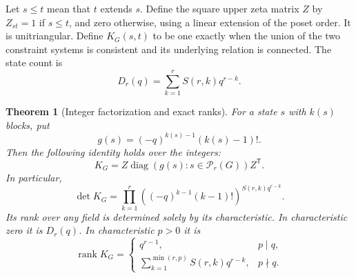 \documentclass[11pt,letterpaper]{article}
\newtheorem{theorem}{Theorem}[section]
\theoremstyle{definition}
\newcommand{\PG}{\mathcal P_r(G)}
\newcommand{\rank}{\operatorname{rank}}
\newcommand{\diag}{\operatorname{diag}}
\begin{document}
Let $s\le t$ mean that $t$ extends $s$. Define the square upper zeta matrix $Z$ by $Z_{st}=1$ if $s\le t$, and zero otherwise, using a linear extension of the poset order. It is unitriangular. Define $K_G(s,t)$ to be one exactly when the union of the two constraint systems is consistent and its underlying relation is connected. The state count is
\begin{equation}\label{eq:group-count}
 D_r(q)=\sum_{k=1}^r S(r,k)q^{r-k}.
\end{equation}

\begin{theorem}[Integer factorization and exact ranks]\label{thm:group-rank}
For a state $s$ with $k(s)$ blocks, put
\[
 g(s)=(-q)^{k(s)-1}(k(s)-1)!.
\]
Then the following identity holds over the integers:
\begin{equation}\label{eq:zeta-factor}
 K_G=Z\diag(g(s):s\in\PG)Z^{\mathsf T}.
\end{equation}
In particular,
\begin{equation}\label{eq:determinant}
 \det K_G=\prod_{k=1}^r\left((-q)^{k-1}(k-1)!\right)^{S(r,k)q^{r-k}}.
\end{equation}
Its rank over any field is determined solely by its characteristic. In characteristic zero it is $D_r(q)$. In characteristic $p>0$ it is
\begin{equation}\label{eq:rank-p}
 \rank K_G=
 \begin{cases}
 q^{r-1},&p\mid q,\\[2pt]
 \displaystyle\sum_{k=1}^{\min(r,p)}S(r,k)q^{r-k},&p\nmid q.
 \end{cases}
\end{equation}
\end{theorem}
\end{document}
